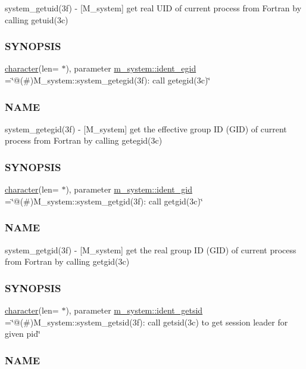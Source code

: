 \begin{DoxyCompactItemize}
\begin{DoxyCompactList}
system\+\_\+getuid(3f) -\/ \mbox{[}M\+\_\+system\mbox{]} get real U\+ID of current process from Fortran by calling getuid(3c) \subsubsection*{S\+Y\+N\+O\+P\+S\+IS}\end{DoxyCompactList}\item 
\hyperlink{option__stopwatch_83_8txt_abd4b21fbbd175834027b5224bfe97e66}{character}(len= $\ast$), parameter \hyperlink{namespacem__system_ad016bff246da00ba4d615fd68345d120}{m\+\_\+system\+::ident\+\_\+egid} =\char`\"{}@(\#)M\+\_\+system\+::system\+\_\+getegid(3f)\+: call getegid(3c)\char`\"{}
\begin{DoxyCompactList}\small\item\em \subsubsection*{N\+A\+ME}

system\+\_\+getegid(3f) -\/ \mbox{[}M\+\_\+system\mbox{]} get the effective group ID (G\+ID) of current process from Fortran by calling getegid(3c) \subsubsection*{S\+Y\+N\+O\+P\+S\+IS}\end{DoxyCompactList}\item 
\hyperlink{option__stopwatch_83_8txt_abd4b21fbbd175834027b5224bfe97e66}{character}(len= $\ast$), parameter \hyperlink{namespacem__system_aef12712abc21ae9a60c24a59dc6dcb8c}{m\+\_\+system\+::ident\+\_\+gid} =\char`\"{}@(\#)M\+\_\+system\+::system\+\_\+getgid(3f)\+: call getgid(3c)\char`\"{}
\begin{DoxyCompactList}\small\item\em \subsubsection*{N\+A\+ME}

system\+\_\+getgid(3f) -\/ \mbox{[}M\+\_\+system\mbox{]} get the real group ID (G\+ID) of current process from Fortran by calling getgid(3c) \subsubsection*{S\+Y\+N\+O\+P\+S\+IS}\end{DoxyCompactList}\item 
\hyperlink{option__stopwatch_83_8txt_abd4b21fbbd175834027b5224bfe97e66}{character}(len= $\ast$), parameter \hyperlink{namespacem__system_a16a71dfbcb5290eef064fa7f628018bb}{m\+\_\+system\+::ident\+\_\+getsid} =\char`\"{}@(\#)M\+\_\+system\+::system\+\_\+getsid(3f)\+: call getsid(3c) to get session leader for given pid\char`\"{}
\begin{DoxyCompactList}\small\item\em \subsubsection*{N\+A\+ME}


\end{DoxyCompactList}
\end{DoxyCompactItemize}
